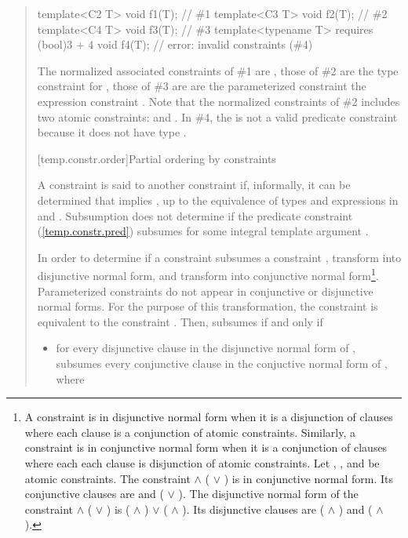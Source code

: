 \begin{quote}
\begin{codeblock}
template<C2 T> void f1(T);                            // \#1
template<C3 T> void f2(T);                            // \#2
template<C4 T> void f3(T);                            // \#3
template<typename T> requires (bool)3 + 4 void f4(T); // error: invalid constraints (\#4)
\end{codeblock}
The normalized associated constraints of \#1 are 
,
% 
those of \#2 are the type constraint for ,
%
those of \#3 are are the parameterized constraint
 the expression constraint .
% 
Note that the normalized constraints of \#2 includes two atomic 
constraints:  and .
% 
In \#4, the  
is not a valid predicate constraint because it does not have type .
\exitexample


[temp.constr.order]{Partial ordering by constraints}

\pnum
A constraint  is said to  another constraint  
if, informally, it can be determined that  implies , up to 
the equivalence of types and expressions in  and .
% 
\enterexample
Subsumption does not determine if the predicate constraint 
 (\ref{temp.constr.pred}) subsumes  for some 
integral template argument .
\exitexample


\pnum
In order to determine if a constraint  subsumes a constraint
, transform  into disjunctive normal form, 
and transform  into conjunctive normal form\footnote{
A constraint is in disjunctive normal form when it is a disjunction of
clauses where each clause is a conjunction of atomic constraints. 
% 
Similarly, a constraint is in conjunctive normal form when it is a conjunction 
of clauses where each each clause is disjunction of atomic constraints.
% 
\enterexample
Let , , and  be atomic constraints.
% 
The constraint  $\land$ ( $\lor$ ) is in 
conjunctive normal form.
% 
Its conjunctive clauses are  and ( $\lor$ ).
% 
The disjunctive normal form of the constraint
 $\land$ ( $\lor$ ) 
is
( $\land$ ) $\lor$ ( $\land$ ).
% 
Its disjunctive clauses are ( $\land$ ) and 
( $\land$ ).
\exitexample
}.
% 
Parameterized constraints do not appear in conjunctive or disjunctive normal
forms. For the purpose of this transformation, the constraint
 is equivalent to the constraint .
% 
Then,  subsumes  if and only if
\begin{itemize}
\item for every disjunctive clause  in the disjunctive normal 
form of ,  subsumes every conjunctive clause  
in the conjuctive normal form of , where


\end{itemize}
\end{quote}
